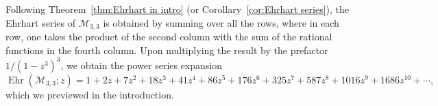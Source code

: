 \documentclass[noamsfonts,10pt]{amsart}
\newcommand{\M}{\mathcal{M}}
\DeclareMathOperator{\Ehr}{Ehr}
\newcommand{\1}{\mathbf{1}}
\theoremstyle{plain}
\theoremstyle{definition}
\numberwithin{equation}{section}
\begin{document}


Following Theorem~\ref{thm:Ehrhart in intro} (or Corollary~\ref{cor:Ehrhart series}), the Ehrhart series of $\M_{3,3}$ is obtained by summing over all the rows, where in each row, one takes the product of the second column with the sum of the rational functions in the fourth column.
Upon multiplying the result by the prefactor $1/(1-z^3)^3$, we obtain the power series expansion
\[
    \Ehr(\M_{3,3}; z) = 1 + 2 z + 7 z^2 + 18 z^3 + 41 z^4 + 86 z^5 + 176 z^6 + 325 z^7 + 
 587 z^8 + 1016 z^9 + 1686 z^{10} + \cdots,
\]
which we previewed in the introduction.




\end{document}
